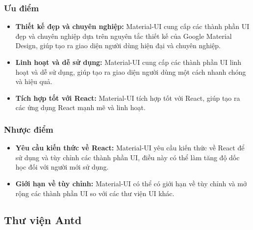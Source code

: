 \subsubsection{Ưu điểm}
\begin{itemize}
  \item \textbf{Thiết kế đẹp và chuyên nghiệp:} Material-UI cung cấp các thành phần UI đẹp và chuyên nghiệp dựa trên nguyên tắc thiết kế của Google Material Design, giúp tạo ra giao diện người dùng hiện đại và chuyên nghiệp.
  \item \textbf{Linh hoạt và dễ sử dụng:} Material-UI cung cấp các thành phần UI linh hoạt và dễ sử dụng, giúp tạo ra giao diện người dùng một cách nhanh chóng và hiệu quả.
  \item \textbf{Tích hợp tốt với React:} Material-UI tích hợp tốt với React, giúp tạo ra các ứng dụng React mạnh mẽ và linh hoạt.
\end{itemize}
\subsubsection{Nhược điểm}
\begin{itemize}
  \item \textbf{Yêu cầu kiến thức về React:} Material-UI yêu cầu kiến thức về React để sử dụng và tùy chỉnh các thành phần UI, điều này có thể làm tăng độ dốc học đối với người mới sử dụng.
  \item \textbf{Giới hạn về tùy chỉnh:} Material-UI có thể có giới hạn về tùy chỉnh và mở rộng các thành phần UI so với các thư viện UI khác.
\end{itemize}
\subsection{Thư viện Antd}
